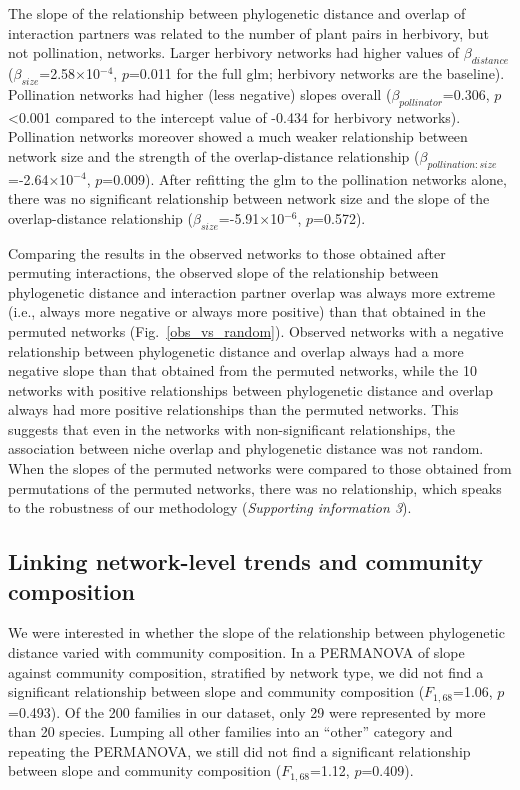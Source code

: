 \documentclass[12pt]{article}
\begin{document}
\begin{spacing}{1.5}
    The slope of the relationship between phylogenetic distance and 
    overlap of interaction partners was related to the number of plant pairs 
    in herbivory, but not pollination, networks. Larger herbivory networks 
    had higher values of $\beta_{distance}$ 
    ($\beta_{size}$=2.58$\times$10$^{-4}$, $p$=0.011 for the full glm; 
    herbivory networks are the baseline). Pollination networks had 
    higher (less negative) slopes overall ($\beta_{pollinator}$=0.306, 
    $p$\textless0.001 compared to the intercept value of -0.434 for 
    herbivory networks). Pollination networks moreover showed a 
    much weaker relationship between network size and the strength of the 
    overlap-distance relationship 
    ($\beta_{pollination:size}$=-2.64$\times$10$^{-4}$, $p$=0.009). 
    After refitting the glm to the pollination networks alone, there was 
    no significant relationship between network size and the slope of 
    the overlap-distance relationship ($\beta_{size}$=-5.91$\times$10$^{-6}$, 
    $p$=0.572).


    Comparing the results in the observed networks to those obtained after 
    permuting interactions, the observed 
    slope of the relationship between phylogenetic distance and interaction 
    partner overlap was always more extreme (i.e., always more negative or 
    always more positive) than that obtained in the permuted networks (Fig.~\ref{obs_vs_random}).
    Observed networks with a negative relationship between phylogenetic distance 
    and overlap always had a more negative slope than that obtained from the 
    permuted networks, while the 10 networks with positive relationships 
    between phylogenetic distance and overlap always had more positive 
    relationships than the permuted networks. This suggests that even in 
    the networks with non-significant relationships, the association between niche overlap and 
    phylogenetic distance was not random. When the slopes of the permuted 
    networks were compared to those obtained from permutations of the 
    permuted networks, there was no relationship, which speaks to the robustness of our methodology (\emph{Supporting information 3}). 


  \subsection*{Linking network-level trends and community composition} 

    We were interested in whether the slope of the relationship between phylogenetic distance varied with community composition. In a PERMANOVA of slope against community composition, stratified by network type, we did not find a significant relationship between slope and community composition ($F_{1,68}$=1.06, $p$=0.493). Of the 200 families in our dataset, only 29 were represented by more than 20 species. Lumping all other families into an ``other'' category and repeating the PERMANOVA, we still did not find a significant relationship between slope and community composition ($F_{1,68}$=1.12, $p$=0.409). 



\end{spacing}
\end{document}
